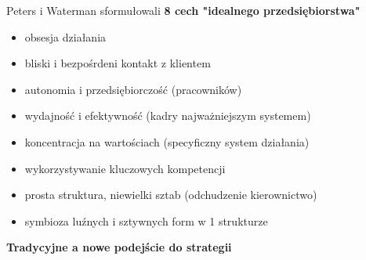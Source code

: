 \documentclass[a4paper,10pt]{report}
\begin{document}
Peters i Waterman sformułowali \textbf{8 cech "idealnego przedsiębiorstwa"}
\begin{itemize}
	\item obsesja działania
	\item bliski i bezpośrdeni kontakt z klientem
	\item autonomia i przedsiębiorczość (pracowników)
	\item wydajność i efektywność (kadry najważniejszym systemem)
	\item koncentracja na wartościach (specyficzny system działania)
	\item wykorzystywanie kluczowych kompetencji
	\item prosta struktura, niewielki sztab (odchudzenie kierownictwo)
	\item symbioza luźnych i sztywnych form w 1 strukturze
\end{itemize}

\textbf{Tradycyjne a nowe podejście do strategii}
\end{document}
